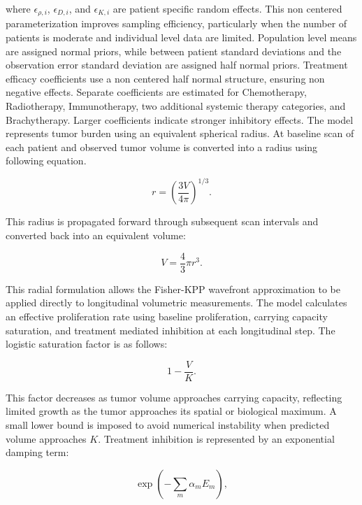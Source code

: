where $\epsilon_{\rho,i}$, $\epsilon_{D,i}$, and $\epsilon_{K,i}$ are patient specific random effects. This non centered parameterization improves sampling efficiency, particularly when the number of patients is moderate and individual level data are limited. Population level means are assigned normal priors, while between patient standard deviations and the observation error standard deviation are assigned half normal priors. Treatment efficacy coefficients use a non centered half normal structure, ensuring non negative effects. Separate coefficients are estimated for Chemotherapy, Radiotherapy, Immunotherapy, two additional systemic therapy categories, and Brachytherapy. Larger coefficients indicate stronger inhibitory effects. The model represents tumor burden using an equivalent spherical radius. At baseline scan of each patient and observed tumor volume is converted into a radius using following equation.

\begin{equation}
r=\left(\frac{3V}{4\pi}\right)^{1/3}.
\end{equation}

This radius is propagated forward through subsequent scan intervals and converted back into an equivalent volume:

\begin{equation}
V=\frac{4}{3}\pi r^{3}.
\end{equation}

This radial formulation allows the Fisher-KPP wavefront approximation to be applied directly to longitudinal volumetric measurements. The model calculates an effective proliferation rate using baseline proliferation, carrying capacity saturation, and treatment mediated inhibition at each longitudinal step. The logistic saturation factor is as follows:

\begin{equation}
1-\frac{V}{K}.
\end{equation}

This factor decreases as tumor volume approaches carrying capacity, reflecting limited growth as the tumor approaches its spatial or biological maximum. A small lower bound is imposed to avoid numerical instability when predicted volume approaches $K$. Treatment inhibition is represented by an exponential damping term:

\begin{equation}
\exp\left(-\sum_{m}\alpha_mE_m\right),
\end{equation}


